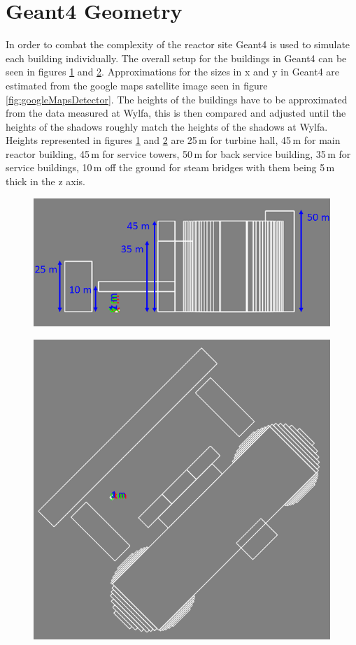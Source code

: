 \documentclass[12pt,a4paper]{article}
\begin{document}
\section{Geant4 Geometry} \label{sec:geant4Geometry}
In order to combat the complexity of the reactor site Geant4 \cite{Agostinelli:2002hh} is used to simulate each building individually. The overall setup for the buildings in Geant4 can be seen in figures \ref{fig:WylfaSideOnG4} and \ref{fig:WylfaTopDownG4}. Approximations for the sizes in x and y in Geant4 are estimated from the google maps satellite image seen in figure \ref{fig:googleMapsDetector}. The heights of the buildings have to be approximated from the data measured at Wylfa, this is then compared and adjusted until the heights of the shadows roughly match the heights of the shadows at Wylfa. Heights represented in figures \ref{fig:WylfaSideOnG4} and \ref{fig:WylfaTopDownG4} are 25\,m for turbine hall, 45\,m for main reactor building, 45\,m for service towers, 50\,m for back service building, 35\,m for service buildings, 10\,m off the ground for steam bridges with them being 5\,m thick in the z axis. 

\begin{figure}[H]
 \centering
 \includegraphics[width=0.6\linewidth]{wylfaReactorBuildings/WylfaG4GeometryHeight.png}
  \label{fig:WylfaSideOnG4}
\end{figure}

\begin{figure}[H]
 \centering
 \includegraphics[width=0.5\linewidth]{wylfaReactorBuildings/WylfaTopDownGeomRedoCut.png}
  \label{fig:WylfaTopDownG4}
\end{figure}
\end{document}
